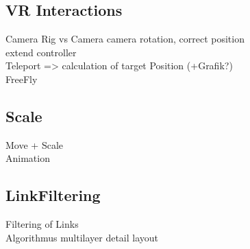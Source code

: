 \subsection{VR Interactions}
\label{sec:vrInteractions}

Camera Rig vs Camera
camera rotation, correct position 
\\
extend controller
\\
Teleport => calculation of target Position (+Grafik?)
\\
FreeFly

\subsection{Scale}
\label{sec:scaling}

Move + Scale\\
Animation
\\

\subsection{LinkFiltering}
\label{sec:linkFiltering}

Filtering of Links\\
Algorithmus multilayer detail layout\\
